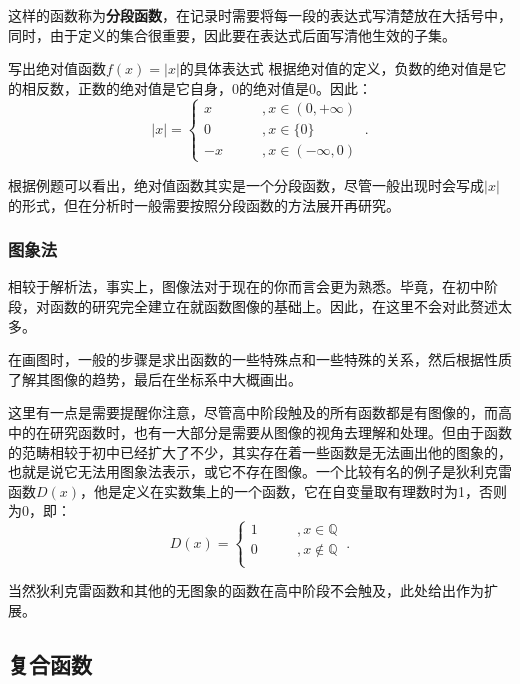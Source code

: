 这样的函数称为\textbf{分段函数}，在记录时需要将每一段的表达式写清楚放在大括号中，同时，由于定义的集合很重要，因此要在表达式后面写清他生效的子集。
\begin{example}{写出绝对值函数$f(x)=|x|$的具体表达式}
根据绝对值的定义，负数的绝对值是它的相反数，正数的绝对值是它自身，0的绝对值是0。因此：
\begin{equation}
|x|=
\begin{cases}
x\qquad&,x\in(0,+\infty)\\
0\qquad&,x\in\{0\}\\
-x\qquad&,x\in(-\infty,0)
\end{cases}~.
\end{equation}
\end{example}

根据例题可以看出，绝对值函数其实是一个分段函数，尽管一般出现时会写成$|x|$的形式，但在分析时一般需要按照分段函数的方法展开再研究。

\subsubsection{图象法}

相较于解析法，事实上，图像法对于现在的你而言会更为熟悉。毕竟，在初中阶段，对函数的研究完全建立在就函数图像的基础上。因此，在这里不会对此赘述太多。

在画图时，一般的步骤是求出函数的一些特殊点和一些特殊的关系，然后根据性质了解其图像的趋势，最后在坐标系中大概画出。

这里有一点是需要提醒你注意，尽管高中阶段触及的所有函数都是有图像的，而高中的在研究函数时，也有一大部分是需要从图像的视角去理解和处理。但由于函数的范畴相较于初中已经扩大了不少，其实存在着一些函数是无法画出他的图象的，也就是说它无法用图象法表示，或它不存在图像。一个比较有名的例子是狄利克雷函数$D(x)$，他是定义在实数集上的一个函数，它在自变量取有理数时为1，否则为0，即：
\begin{equation}
D(x)=\begin{cases}
1\qquad&, x\in\mathbb{Q} \\
0\qquad&, x\notin\mathbb{Q}  \\
\end{cases} ~.
\end{equation}

当然狄利克雷函数和其他的无图象的函数在高中阶段不会触及，此处给出作为扩展。

\subsection{复合函数}

